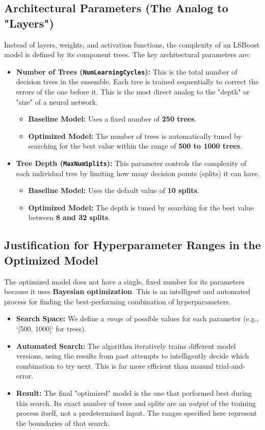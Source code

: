 \documentclass[11pt]{article}
\begin{document}
\subsection*{Architectural Parameters (The Analog to "Layers")}
Instead of layers, weights, and activation functions, the complexity of an LSBoost model is defined by its component trees. The key architectural parameters are:
\begin{itemize}
    \item \textbf{Number of Trees (\texttt{NumLearningCycles}):} This is the total number of decision trees in the ensemble. Each tree is trained sequentially to correct the errors of the one before it. This is the most direct analog to the "depth" or "size" of a neural network.
        \begin{itemize}
            \item \textbf{Baseline Model:} Uses a fixed number of \textbf{250 trees}.
            \item \textbf{Optimized Model:} The number of trees is automatically tuned by searching for the best value within the range of \textbf{500 to 1000 trees}.
        \end{itemize}
    \item \textbf{Tree Depth (\texttt{MaxNumSplits}):} This parameter controls the complexity of each individual tree by limiting how many decision points (splits) it can have.
        \begin{itemize}
            \item \textbf{Baseline Model:} Uses the default value of \textbf{10 splits}.
            \item \textbf{Optimized Model:} The depth is tuned by searching for the best value between \textbf{8 and 32 splits}.
        \end{itemize}
\end{itemize}

\subsection*{Justification for Hyperparameter Ranges in the Optimized Model}
The optimized model does not have a single, fixed number for its parameters because it uses \textbf{Bayesian optimization}. This is an intelligent and automated process for finding the best-performing combination of hyperparameters.
\begin{itemize}
    \item \textbf{Search Space:} We define a \textit{range} of possible values for each parameter (e.g., `[500, 1000]` for trees).
    \item \textbf{Automated Search:} The algorithm iteratively trains different model versions, using the results from past attempts to intelligently decide which combination to try next. This is far more efficient than manual trial-and-error.
    \item \textbf{Result:} The final "optimized" model is the one that performed best during this search. Its exact number of trees and splits are an \textit{output} of the training process itself, not a predetermined input. The ranges specified here represent the boundaries of that search.
\end{itemize}
\end{document}
